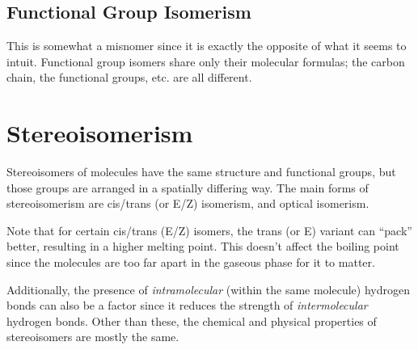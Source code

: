 



		\pagebreak
		\subsection{Functional Group Isomerism}
			This is somewhat a misnomer since it is exactly the opposite of what it seems to intuit. Functional group isomers
			share only their molecular formulas; the carbon chain, the functional groups, etc. are all different.






	\section{Stereoisomerism}

		Stereoisomers of molecules have the same structure and functional groups, but those groups are arranged in a spatially
		differing way. The main forms of stereoisomerism are cis/trans (or E/Z) isomerism, and optical isomerism.

		Note that for certain cis/trans (E/Z) isomers, the trans (or E) variant can \enquote{pack} better, resulting in a higher melting
		point. This doesn't affect the boiling point since the molecules are too far apart in the gaseous phase for it to matter.

		Additionally, the presence of \textit{intramolecular} (within the same molecule) hydrogen bonds can also be a factor since
		it reduces the strength of \textit{intermolecular} hydrogen bonds. Other than these, the chemical and physical properties of
		stereoisomers are mostly the same.



